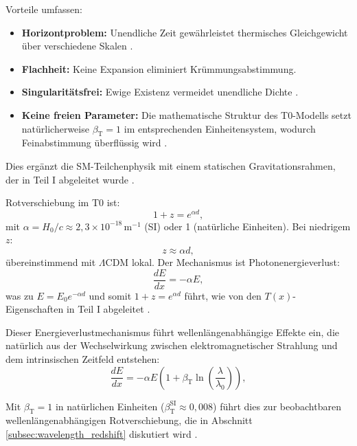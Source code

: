 \documentclass[12pt,a4paper]{article}
\newcommand{\Tfield}{T(x)}
\newcommand{\betaT}{\beta_{\text{T}}}
\newcommand{\LCDM}{\Lambda\text{CDM}}
\begin{document}
	Vorteile umfassen:
	\begin{itemize}
		\item \textbf{Horizontproblem:} Unendliche Zeit gewährleistet thermisches Gleichgewicht über verschiedene Skalen \cite{pascher_messdifferenzen_2025}.
		\item \textbf{Flachheit:} Keine Expansion eliminiert Krümmungsabstimmung.
		\item \textbf{Singularitätsfrei:} Ewige Existenz vermeidet unendliche Dichte \cite{pascher_perspective_2025}.
		\item \textbf{Keine freien Parameter:} Die mathematische Struktur des T0-Modells setzt natürlicherweise \(\betaT = 1\) im entsprechenden Einheitensystem, wodurch Feinabstimmung überflüssig wird \cite{pascher_alphabeta_2025}.
	\end{itemize}
	
	Dies ergänzt die SM-Teilchenphysik mit einem statischen Gravitationsrahmen, der in Teil I abgeleitet wurde \cite{pascher_part1_2025}.
	
	Rotverschiebung im T0 ist:
	\begin{equation}
		1 + z = e^{\alpha d},
		\label{eq:redshift_distance}
	\end{equation}
	mit \(\alpha = H_0 / c \approx 2,3 \times 10^{-18} \, \text{m}^{-1}\) (SI) oder 1 (natürliche Einheiten). Bei niedrigem \(z\):
	\begin{equation}
		z \approx \alpha d,
		\label{eq:hubble_approx}
	\end{equation}
	übereinstimmend mit \(\LCDM\) lokal. Der Mechanismus ist Photonenergieverlust:
	\begin{equation}
		\frac{dE}{dx} = -\alpha E,
		\label{eq:energy_loss_rate}
	\end{equation}
	was zu \(E = E_0 e^{-\alpha d}\) und somit \(1 + z = e^{\alpha d}\) führt, wie von den \(\Tfield\)-Eigenschaften in Teil I abgeleitet \cite{pascher_part1_2025}.
	
	Dieser Energieverlustmechanismus führt wellenlängenabhängige Effekte ein, die natürlich aus der Wechselwirkung zwischen elektromagnetischer Strahlung und dem intrinsischen Zeitfeld entstehen:
	\begin{equation}
		\frac{dE}{dx} = -\alpha E \left(1 + \betaT \ln\left(\frac{\lambda}{\lambda_0}\right)\right),
		\label{eq:wavelength_energy_loss}
	\end{equation}
	
	Mit \(\betaT = 1\) in natürlichen Einheiten (\(\betaT^{\text{SI}} \approx 0,008\)) führt dies zur beobachtbaren wellenlängenabhängigen Rotverschiebung, die in Abschnitt \ref{subsec:wavelength_redshift} diskutiert wird \cite{pascher_params_2025}.
	
\end{document}
